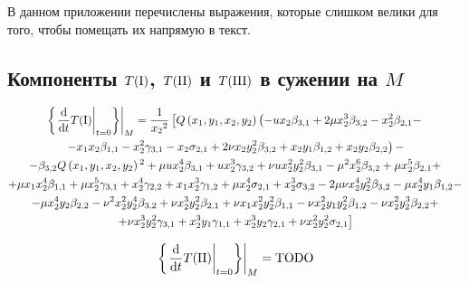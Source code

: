 \documentclass[../main.tex]{subfiles}
\begin{document}
\setcounter{equation}{0}
\renewcommand{\theequation}{ПА.\arabic{equation}}
В данном приложении перечислены выражения, которые слишком велики для того, чтобы помещать их напрямую в текст.

\subsection{Компоненты $T(\mathrm{\RN{1}})$, $T(\mathrm{\RN{2}})$ и $T(\mathrm{\RN{3}})$ в сужении на $M$}
\begin{multline}\label{eq:appendix_t1}
\left.\left\{ \left.\frac{\mathrm d}{\mathrm{d}t}T(\mathrm{\RN{1}})\right|_{t = 0}\right\} \right|_M = \frac{1}{{x_2}^2}\left[Q\left(x_1,y_1,x_2,y_2\right) \left(-u x_2 \beta_{3,1}+2 \mu  x_2^3 \beta_{3,2}-x_2^2 \beta _{2,1} - \right.\right. \\ 
\left. -x_1 x_2 \beta_{1,1} -x_2^2 \gamma_{3,1}-x_2\sigma_{2,1} + 2 \nu  x_2 y_2^2 \beta_{3,2}+x_2 y_1 \beta _{1,2}+x_2 y_2 \beta_{2,2}\right) - \\
- \beta_{3,2} Q\left(x_1,y_1,x_2,y_2\right){}^2 + \mu  u x_2^4 \beta _{3,1}+u x_2^3 \gamma _{3,2}+\nu  u x_2^2 y_2^2 \beta _{3,1}-\mu ^2 x_2^6 \beta_{3,2}+\mu  x_2^5 \beta _{2,1} + \\
+ \mu  x_1 x_2^4 \beta_{1,1}+\mu  x_2^5 \gamma _{3,1}+x_2^4 \gamma _{2,2}+x_1 x_2^3 \gamma _{1,2}+\mu  x_2^4 \sigma _{2,1}+x_2^3 \sigma _{3,2}-2 \mu  \nu  x_2^4 y_2^2 \beta _{3,2}-\mu  x_2^4 y_1 \beta _{1,2} - \\
- \mu  x_2^4 y_2 \beta _{2,2}-\nu ^2 x_2^2 y_2^4 \beta _{3,2}+\nu  x_2^3 y_2^2 \beta _{2,1}+\nu  x_1 x_2^2 y_2^2 \beta _{1,1}-\nu  x_2^2 y_1 y_2^2 \beta _{1,2}-\nu  x_2^2 y_2^3 \beta _{2,2} +\\
\left.+\nu  x_2^3 y_2^2 \gamma _{3,1}+x_2^3 y_1 \gamma_{1,1}+x_2^3 y_2 \gamma _{2,1}+\nu  x_2^2 y_2^2 \sigma _{2,1}\right]
\end{multline}

\begin{multline}\label{eq:appendix_t2}
\left.\left\{ \left.\frac{\mathrm d}{\mathrm{d}t}T(\mathrm{\RN{2}})\right|_{t = 0}\right\} \right|_M = \textrm{TODO}
\end{multline}
\end{document}
